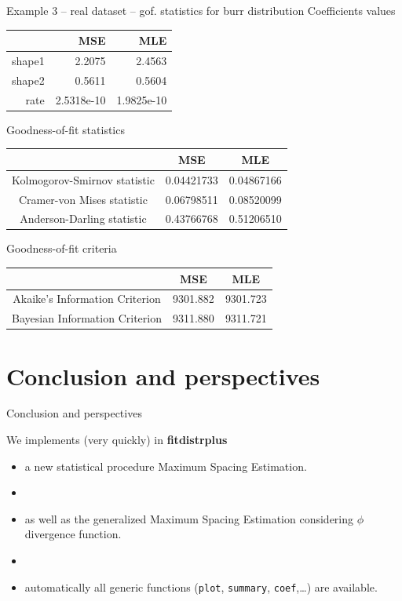 \documentclass[8pt, hide notes]{beamer}
\newcommand{\pkg}{\textbf}
\newcommand{\code}{\texttt}
\begin{document}
\begin{frame}{Example 3 -- real dataset -- gof. statistics for burr distribution}
\centering
Coefficients values\\
\begin{tabular}{rrr}
  \hline
 & MSE & MLE \\ 
  \hline
shape1 & 2.2075 & 2.4563 \\ 
  shape2 & 0.5611 & 0.5604 \\ 
  rate & 2.5318e-10 & 1.9825e-10 \\ 
   \hline
\end{tabular}
\bigskip

Goodness-of-fit statistics\\
\begin{tabular}{ccc}
                             & MSE & MLE \\
\hline                             
Kolmogorov-Smirnov statistic &0.04421733 &0.04867166 \\
\hline                             
Cramer-von Mises statistic   &0.06798511 &0.08520099 \\
\hline                             
Anderson-Darling statistic   &0.43766768 &0.51206510 \\
\hline                             
\end{tabular}
\bigskip

Goodness-of-fit criteria\\
\begin{tabular}{ccc}
                             & MSE & MLE \\
\hline                             
Akaike's Information Criterion   &9301.882   &9301.723 \\
\hline                             
Bayesian Information Criterion   &9311.880   &9311.721 \\
\hline                             
\end{tabular}
\end{frame}



\section{Conclusion and perspectives}

\begin{frame}{Conclusion and perspectives}

We implements (very quickly) in \pkg{fitdistrplus}
\begin{itemize}
\item a new statistical procedure Maximum Spacing Estimation.
\item[]
\item as well as the generalized Maximum Spacing Estimation considering $\phi$ divergence function.
\item[]
\item automatically all generic functions (\code{plot}, \code{summary}, \code{coef},\dots) are available.
\end{itemize}

\end{frame}
\end{document}
